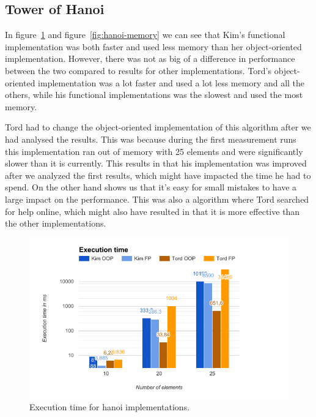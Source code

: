 \documentclass {article}
\begin{document}
\subsection{Tower of Hanoi}
In figure~\ref{fig:hanoi-runtime} and figure~\ref{fig:hanoi-memory} we can see that Kim's functional implementation was both faster and used less memory than her object-oriented implementation. However, there was not as big of a difference in performance between the two compared to results for other implementations. Tord's object-oriented implementation was a lot faster and used a lot less memory and all the others, while his functional implementations was the slowest and used the most memory.

Tord had to change the object-oriented implementation of this algorithm after we had analysed the results. This was because during the first measurement runs this implementation ran out of memory with 25 elements and were significantly slower than it is currently. This results in that his implementation was improved after we analyzed the first results, which might have impacted the time he had to spend. On the other hand shows us that it's easy for small mistakes to have a large impact on the performance. This was also a algorithm where Tord searched for help online, which might also have resulted in that it is more effective than the other implementations.
 
\begin{figure}[H]
\includegraphics[width=\textwidth]{hanoi-runtime}

\caption{Execution time for hanoi implementations.}
\label{fig:hanoi-runtime}
\end{figure}
\end{document}
